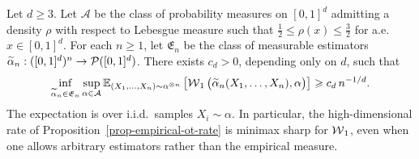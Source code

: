 \begin{prop}\label{prop-minimax-lower-w1-density}
	Let \(d\geq3\). Let \(\mathcal A\) be the class of probability measures on \([0,1]^d\) admitting a density \(\rho\) with respect to Lebesgue measure such that
	$\frac12\leq \rho(x)\leq \frac32$ for a.e.\ $x\in[0,1]^d$.
	For each \(n\geq1\), let \(\mathfrak E_n\) be the class of measurable estimators \(\widetilde\alpha_n:([0,1]^d)^n\to\mathcal{P}([0,1]^d)\).
	There exists \(c_d>0\), depending only on \(d\), such that
	\[
		\inf_{\widetilde\alpha_n\in\mathfrak E_n}
		\sup_{\alpha\in\mathcal A}
		\mathbb{E}_{(X_1,\ldots,X_n)\sim\alpha^{\otimes n}}
		\left[
			\operatorname{\mathcal{W}}_1\big(\widetilde\alpha_n(X_1,\ldots,X_n),\alpha\big)
		\right]
		\geqslant
		c_d\,n^{-1/d}.
	\]
	The expectation is over i.i.d.\ samples \(X_i\sim\alpha\). In particular, the high-dimensional rate of Proposition~\ref{prop-empirical-ot-rate} is minimax sharp for \(\operatorname{\mathcal{W}}_1\), even when one allows arbitrary estimators rather than the empirical measure.
\end{prop}

